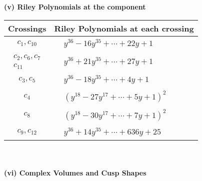\documentclass[1p]{elsarticle_modified}
\theoremstyle{definition}
\begin{document}
\flushleft \textbf{(v) Riley Polynomials at the component}\newline \\
\begin{tabular}{m{50pt}|m{274pt}}
Crossings & \hspace{64pt}Riley Polynomials at each crossing \\
\hline $$\begin{aligned}c_{1},c_{10}\end{aligned}$$&$\begin{aligned}
&y^{36}-16 y^{35}+\cdots+22 y+1
\end{aligned}$\\
\hline $$\begin{aligned}c_{2},c_{6},c_{7}\\c_{11}\end{aligned}$$&$\begin{aligned}
&y^{36}+21 y^{35}+\cdots+27 y+1
\end{aligned}$\\
\hline $$\begin{aligned}c_{3},c_{5}\end{aligned}$$&$\begin{aligned}
&y^{36}-18 y^{35}+\cdots+4 y+1
\end{aligned}$\\
\hline $$\begin{aligned}c_{4}\end{aligned}$$&$\begin{aligned}
&(y^{18}-27 y^{17}+\cdots+5 y+1)^{2}
\end{aligned}$\\
\hline $$\begin{aligned}c_{8}\end{aligned}$$&$\begin{aligned}
&(y^{18}-30 y^{17}+\cdots+7 y+1)^{2}
\end{aligned}$\\
\hline $$\begin{aligned}c_{9},c_{12}\end{aligned}$$&$\begin{aligned}
&y^{36}+14 y^{35}+\cdots+636 y+25
\end{aligned}$\\
\hline
\end{tabular}\\~\\
\newpage\flushleft \textbf{(vi) Complex Volumes and Cusp Shapes}
\end{document}
